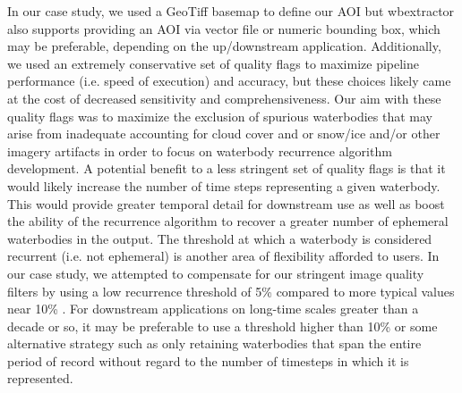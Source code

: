 \documentclass{article}
\begin{document}
In our case study, we used a GeoTiff basemap to define our AOI but wbextractor also supports providing an AOI via vector file or numeric bounding box, which may be preferable, depending on the up/downstream application. Additionally, we used an extremely conservative set of quality flags to maximize pipeline performance (i.e. speed of execution) and accuracy, but these choices likely came at the cost of decreased sensitivity and comprehensiveness. Our aim with these quality flags was to maximize the exclusion of spurious waterbodies that may arise from inadequate accounting for cloud cover and or snow/ice and/or other imagery artifacts in order to focus on waterbody recurrence algorithm development. A potential benefit to a less stringent set of quality flags is that it would likely increase the number of time steps representing a given waterbody. This would provide greater temporal detail for downstream use as well as boost the ability of the recurrence algorithm to recover a greater number of ephemeral waterbodies in the output. The threshold at which a waterbody is considered recurrent (i.e. not ephemeral) is another area of flexibility afforded to users. In our case study, we attempted to compensate for our stringent image quality filters by using a low recurrence threshold of 5\% compared to more typical values near 10\% \citep{khandelwal2022realsat}. For downstream applications on long-time scales greater than a decade or so, it may be preferable to use a threshold higher than 10\% or some alternative strategy such as only retaining waterbodies that span the entire period of record without regard to the number of timesteps in which it is represented.
\end{document}

